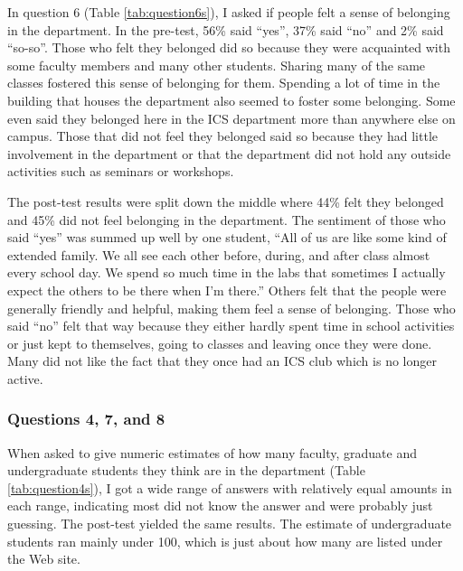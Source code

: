 In question 6 (Table \ref{tab:question6s}), I asked if people felt a sense of
belonging in the department.  In the pre-test, 56\% said ``yes'', 37\% said
``no'' and 2\% said ``so-so''.  Those who felt they belonged did so because
they were acquainted with some faculty members and many other students.
Sharing many of the same classes fostered this sense of belonging for them.
Spending a lot of time in the building that houses the department also seemed
to foster some belonging.  Some even said they belonged here in the ICS
department more than anywhere else on campus.  Those that did not feel they
belonged said so because they had little involvement in the department or that
the department did not hold any outside activities such as seminars or
workshops.

The post-test results were split down the middle where 44\% felt they belonged
and 45\% did not feel belonging in the department.  The sentiment of those who
said ``yes'' was summed up well by one student, ``All of us are like some kind
of extended family.  We all see each other before, during, and after class
almost every school day.  We spend so much time in the labs that sometimes I
actually expect the others to be there when I'm there.''  Others felt that the
people were generally friendly and helpful, making them feel a sense of
belonging.  Those who said ``no'' felt that way because they either hardly
spent time in school activities or just kept to themselves, going to classes
and leaving once they were done.  Many did not like the fact that they once had
an ICS club which is no longer active.

\subsubsection{Questions 4, 7, and 8}

When asked to give numeric estimates of how many faculty, graduate and
undergraduate students they think are in the department (Table
\ref{tab:question4s}), I got a wide range of answers with relatively equal
amounts in each range, indicating most did not know the answer and were
probably just guessing.  The post-test yielded the same results.  The estimate
of undergraduate students ran mainly under 100, which is just about how many
are listed under the Web site.

